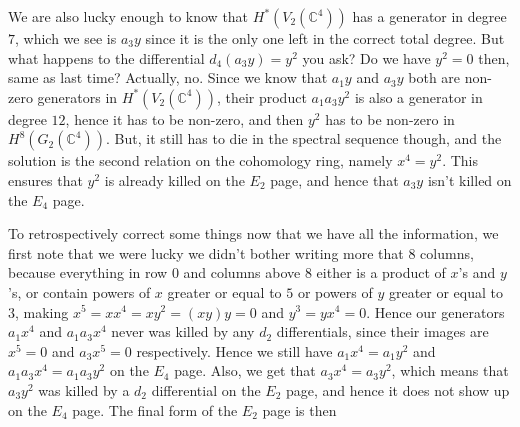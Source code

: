 
We are also lucky enough to know that $H^*(V_2(\mathbb{C}^4))$ has a generator in degree $7$, 
which we see is $a_3y$ since it is the only one left in the correct total degree. 
But what happens to the differential $d_4(a_3y) = y^2$ you ask? Do we have $y^2=0$ then, 
same as last time? 
Actually, no. 
Since we know that $a_1y$ and $a_3y$ both are non-zero generators in $H^*(V_2(\mathbb{C}^4))$, 
their product $a_1a_3y^2$ is also a generator in degree $12$, 
hence it has to be non-zero, 
and then $y^2$ has to be non-zero in $H^8(G_2(\mathbb{C}^4))$. 
But, it still has to die in the spectral sequence though, 
and the solution is the second relation on the cohomology ring, 
namely $x^4=y^2$. 
This ensures that $y^2$ is already killed on the $E_2$ page, 
and hence that $a_3y$ isn't killed on the $E_4$ page.

To retrospectively correct some things now that we have all the information, 
we first note that we were lucky we didn't bother writing more that $8$ columns, 
because everything in row $0$ and columns above $8$ either is a product of $x$'s and $y$'s, 
or contain powers of $x$ greater or equal to $5$ or powers of $y$ greater or equal to $3$, 
making $x^5 = xx^4=xy^2=(xy)y=0$ and $y^3=yx^4=0$. 
Hence our generators $a_1x^4$ and $a_1a_3x^4$ never was killed by any $d_2$ differentials, 
since their images are $x^5=0$ and $a_3x^5=0$ respectively. 
Hence we still have $a_1x^4=a_1y^2$ and $a_1a_3x^4=a_1a_3y^2$ on the $E_4$ page. 
Also, we get that $a_3x^4=a_3y^2$, 
which means that $a_3y^2$ was killed by a $d_2$ differential on the $E_2$ page, 
and hence it does not show up on the $E_4$ page. 
The final form of the $E_2$ page is then

